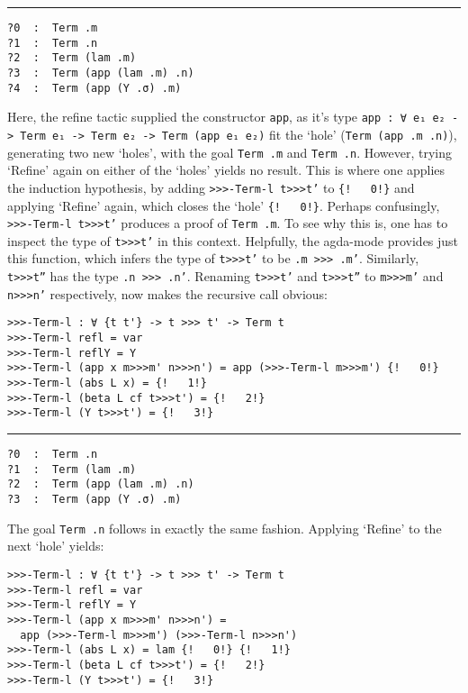 \documentclass[a4paper, 12pt, twoside]{style/ociamthesis}
\theoremstyle{plain}
\theoremstyle{definition}
\newtheorem{Example}{Example}[chapter]
\theoremstyle{remark}
\renewenvironment{Example}{\begin{OldExample}\begin{mdframed}[style=example, linecolor=yellow]}{\end{mdframed}\end{OldExample}}
\begin{document}
\begin{Example}
\noindent\rule{8cm}{0.4pt}

\begin{verbatim}
?0  :  Term .m
?1  :  Term .n
?2  :  Term (lam .m)
?3  :  Term (app (lam .m) .n)
?4  :  Term (app (Y .σ) .m)
\end{verbatim}

Here, the refine tactic supplied the constructor \texttt{app}, as it's
type \texttt{app : ∀ {e₁ e₂} -> Term e₁ -> Term e₂ -> Term (app e₁ e₂)}
fit the `hole' (\texttt{Term (app .m .n)}), generating two new `holes',
with the goal \texttt{Term .m} and \texttt{Term .n}. However, trying
`Refine' again on either of the `holes' yields no result. This is where
one applies the induction hypothesis, by adding
\texttt{>>>-Term-l t>>>t'} to \texttt{\{!\ \ \ 0!\}} and applying
`Refine' again, which closes the `hole' \texttt{\{!\ \ \ 0!\}}. Perhaps
confusingly, \texttt{>>>-Term-l t>>>t'} produces a proof of
\texttt{Term .m}. To see why this is, one has to inspect the type of
\texttt{t>>>t'} in this context. Helpfully, the agda-mode provides just
this function, which infers the type of \texttt{t>>>t'} to be
\texttt{.m >>> .m'}. Similarly, \texttt{t>>>t''} has the type
\texttt{.n >>> .n'}. Renaming \texttt{t>>>t'} and \texttt{t>>>t''} to
\texttt{m>>>m'} and \texttt{n>>>n'} respectively, now makes the
recursive call obvious:

\begin{verbatim}
>>>-Term-l : ∀ {t t'} -> t >>> t' -> Term t
>>>-Term-l refl = var
>>>-Term-l reflY = Y
>>>-Term-l (app x m>>>m' n>>>n') = app (>>>-Term-l m>>>m') {!   0!}
>>>-Term-l (abs L x) = {!   1!}
>>>-Term-l (beta L cf t>>>t') = {!   2!}
>>>-Term-l (Y t>>>t') = {!   3!}
\end{verbatim}

\noindent\rule{8cm}{0.4pt}

\begin{verbatim}
?0  :  Term .n
?1  :  Term (lam .m)
?2  :  Term (app (lam .m) .n)
?3  :  Term (app (Y .σ) .m)
\end{verbatim}

The goal \texttt{Term .n} follows in exactly the same fashion. Applying
`Refine' to the next `hole' yields:

\begin{verbatim}
>>>-Term-l : ∀ {t t'} -> t >>> t' -> Term t
>>>-Term-l refl = var
>>>-Term-l reflY = Y
>>>-Term-l (app x m>>>m' n>>>n') = 
  app (>>>-Term-l m>>>m') (>>>-Term-l n>>>n')
>>>-Term-l (abs L x) = lam {!   0!} {!   1!}
>>>-Term-l (beta L cf t>>>t') = {!   2!}
>>>-Term-l (Y t>>>t') = {!   3!}
\end{verbatim}


\end{Example}
\end{document}
